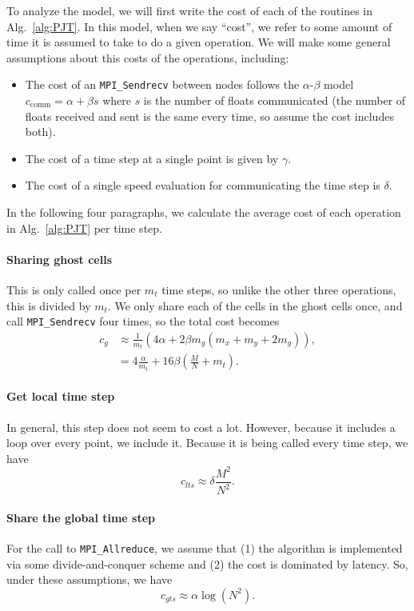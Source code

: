 \documentclass{article}
\begin{document}
To analyze the model, we will first write the cost of each of the routines in Alg.~\ref{alg:PJT}. In this model, when we say ``cost'', we refer to some amount of time it is assumed to take to do a given operation. We will make some general assumptions about this costs of the operations, including:
\begin{itemize}
    \item The cost of an \texttt{MPI\_Sendrecv} between nodes follows the $\alpha$-$\beta$ model $c_{\textrm{comm}} = \alpha + \beta s$ where $s$ is the number of floats communicated (the number of floats received and sent is the same every time, so assume the cost includes both).
    \item The cost of a time step at a single point is given by $\gamma$.
    \item The cost of a single speed evaluation for communicating the time step is $\delta$. 
\end{itemize}
In the following four paragraphs, we calculate the average cost of each operation in Alg.~\ref{alg:PJT} per time step.


\paragraph{Sharing ghost cells} This is only called once per $m_t$ time steps, so unlike the other three operations, this is divided by $m_t$. We only share each of the cells in the ghost cells once, and call \texttt{MPI\_Sendrecv} four times, so the total cost becomes
\begin{align}
\nonumber
    c_{g} &\approx \frac{1}{m_t}\left(4 \alpha + 2 \beta m_g (m_x + m_y + 2m_g)\right),\\
\label{eq:cg}
          &= 4\frac{\alpha}{m_t} + 16 \beta \left(\frac{M}{N}  +  m_t\right).
\end{align}

\paragraph{Get local time step} In general, this step does not seem to cost a lot. However, because it includes a loop over every point, we include it. Because it is being called every time step, we have
\begin{equation*}
    c_{lts} \approx \delta \frac{M^2}{N^2}.
\end{equation*}

\paragraph{Share the global time step} For the call to \texttt{MPI\_Allreduce}, we assume that (1) the algorithm is implemented via some divide-and-conquer scheme and (2) the cost is dominated by latency. So, under these assumptions, we have
\begin{equation*}
    c_{gts} \approx \alpha \log(N^2).
\end{equation*}
\end{document}
